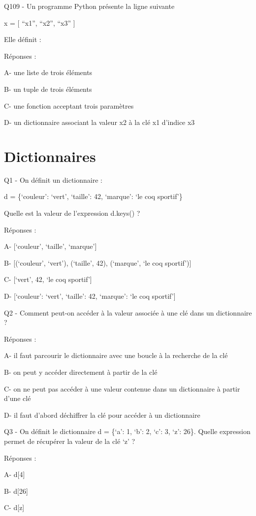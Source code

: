 \documentclass[
]{book}
\begin{document}
Q109 - Un programme Python présente la ligne suivante

x = {[} ``x1'', ``x2'', ``x3'' {]}

Elle définit :

Réponses :

A- une liste de trois éléments

B- un tuple de trois éléments

C- une fonction acceptant trois paramètres

D- un dictionnaire associant la valeur x2 à la clé x1 d'indice x3

\hypertarget{dictionnaires}{%
\section{Dictionnaires}\label{dictionnaires}}

Q1 - On définit un dictionnaire :

d = \{`couleur': `vert', `taille': 42, `marque': `le coq sportif'\}

Quelle est la valeur de l'expression d.keys() ?

Réponses :

A- {[}`couleur', `taille', `marque'{]}

B- {[}(`couleur', `vert'), (`taille', 42), (`marque', `le coq sportif'){]}

C- {[}`vert', 42, `le coq sportif'{]}

D- {[}`couleur': `vert', `taille': 42, `marque': `le coq sportif'{]}

Q2 - Comment peut-on accéder à la valeur associée à une clé dans un dictionnaire ?

Réponses :

A- il faut parcourir le dictionnaire avec une boucle à la recherche de la clé

B- on peut y accéder directement à partir de la clé

C- on ne peut pas accéder à une valeur contenue dans un dictionnaire à partir d'une clé

D- il faut d'abord déchiffrer la clé pour accéder à un dictionnaire

Q3 - On définit le dictionnaire d = \{`a': 1, `b': 2, `c': 3, `z': 26\}. Quelle expression permet de récupérer la valeur de la clé `z' ?

Réponses :

A- d{[}4{]}

B- d{[}26{]}

C- d{[}z{]}
\end{document}
